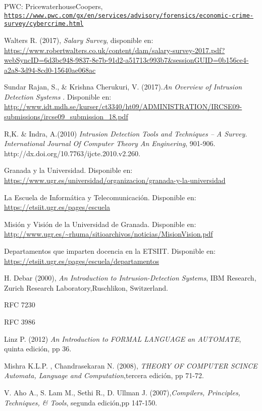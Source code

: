 \begin{thebibliography}{99}
PWC: PricewaterhouseCoopers,
\\\texttt{\url{https://www.pwc.com/gx/en/services/advisory/forensics/economic-crime-survey/cybercrime.html}}

Walters R. (2017), \textit{Salary Survey}, disponible en: \url{https://www.robertwalters.co.uk/content/dam/salary-survey-2017.pdf?webSyncID=6d3bc948-9837-8e7b-91d2-a51713c993b7&sessionGUID=0b156ce4-a2a8-3d94-8cd0-15640ae068ac}

 Sundar Rajan, S., \& Krishna Cherukuri, V. (2017).\textit{An Overview of Intrusion Detection Systems }. Disponible en: \url{http://www.idt.mdh.se/kurser/ct3340/ht09/ADMINISTRATION/IRCSE09-submissions/ircse09_submission_18.pdf}

 R,K. \& Indra, A.(2010) \textit{Intrusion Detection Tools and Techniques --
A Survey. International Journal Of Computer Theory An Enginering}, 901-906. http://dx.doi.org/10.7763/ijcte.2010.v2.260.

 Granada y la Universidad. Disponible en: \url{https://www.ugr.es/universidad/organizacion/granada-y-la-universidad}

 La Escuela de Informática y Telecomunicación. Disponible en: \url{https://etsiit.ugr.es/pages/escuela}

 Misión y Visión de la Universidad de Granada. Disponible en: \url{http://www.ugr.es/~rhuma/sitioarchivos/noticias/MisionVision.pdf}

 Departamentos que imparten docencia en la ETSIIT. Disponible en: \url{https://etsiit.ugr.es/pages/escuela/departamentos}

H.   Debar (2000), \textit{An Introduction to Intrusion-Detection Systems},  IBM   Research,   Zurich   Research   Laboratory,Ruschlikon, Switzerland.

RFC 7230

RFC 3986

Linz P. (2012) \textit{An Introduction to FORMAL LANGUAGE an AUTOMATE}, quinta edición, pp 36.

Mishra K.L.P. , Chandrasekaran N. (2008), \textit{THEORY OF COMPUTER SCINCE Automata, Language and Computation},tercera edición, pp 71-72.

V. Aho A., S. Lam M., Sethi R., D. Ullman J. (2007),\textit{Compilers, Principles, Techniques, \& Tools}, segunda edición,pp 147-150.


\end{thebibliography}
